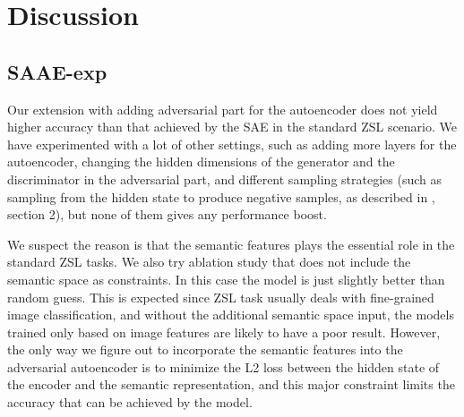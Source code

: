 \documentclass{article}
\begin{document}

\section{Discussion}







\subsection{SAAE-exp}

Our extension with adding adversarial part for the autoencoder does not yield higher accuracy than that achieved by the SAE in the standard ZSL scenario. We have experimented with a lot of other settings, such as adding more layers for the autoencoder, changing the hidden dimensions of the generator and the discriminator in the adversarial part, and different sampling strategies (such as sampling from the hidden state to produce negative samples, as described in \cite{makhzani2015adversarial}, section 2), but none of them gives any performance boost.

We suspect the reason is that the semantic features plays the essential role in the standard ZSL tasks. We also try ablation study that does not include the semantic space as constraints. In this case the model is just slightly better than random guess. This is expected since ZSL task usually deals with fine-grained image classification, and without the additional semantic space input, the models trained only based on image features are likely to have a poor result. However, the only way we figure out to incorporate the semantic features into the adversarial autoencoder is to minimize the L2 loss between the hidden state of the encoder and the semantic representation, and this major constraint limits the accuracy that can be achieved by the model.
\end{document}
